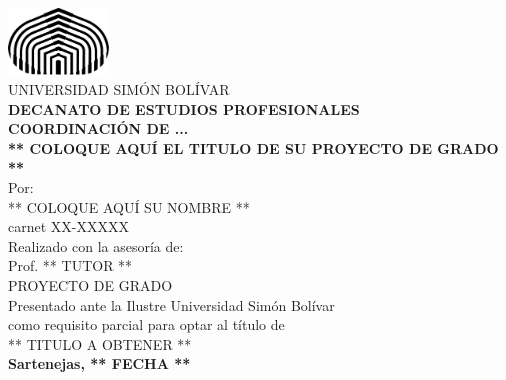 \thispagestyle{empty}
\begin{center}
\includegraphics[width=0.20\textwidth]{Figuras/USB_logo.eps}\\ %
{\large UNIVERSIDAD SIMÓN BOLÍVAR}\\\textbf{DECANATO DE ESTUDIOS PROFESIONALES}\\\textbf{COORDINACIÓN DE ...} %
\\[8\baselineskip]

\textbf{** COLOQUE AQUÍ EL TITULO DE SU PROYECTO DE GRADO **}
\\[2\baselineskip]

Por:\\ ** COLOQUE AQUÍ SU NOMBRE **\\ carnet XX-XXXXX
\\[2\baselineskip]

Realizado con la asesoría de:\\ Prof. ** TUTOR **
\\[4\baselineskip]

PROYECTO DE GRADO\\Presentado ante la Ilustre Universidad Simón Bolívar\\como requisito parcial para optar al título de \\** TITULO A OBTENER **
\\[2\baselineskip]

\textbf{Sartenejas, ** FECHA **}
\end{center}
